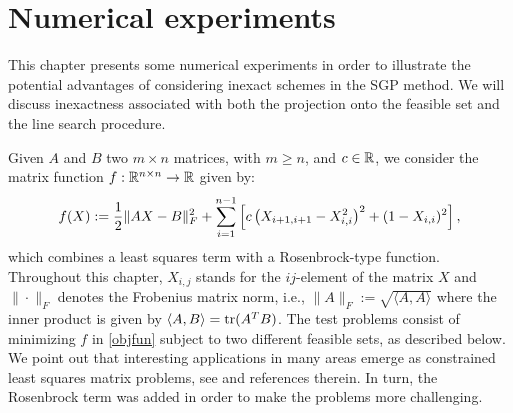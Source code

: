 \chapter{Numerical experiments} \label{chap:NumExp}
\thispagestyle{empty}

This chapter presents some numerical experiments in order to illustrate the potential advantages of considering inexact schemes in the SGP method.
We will discuss inexactness associated with both the projection onto the feasible set and the line search procedure.

Given $A$ and $B$ two $m\times n$ matrices, with $m\geq n$, and $c\in\mathbb{R}$, we consider the matrix function $f:\mathbb{R}^{n\times n}\to\mathbb{R}$ given by:
\begin{equation}\label{objfun}
	f(X):=\displaystyle\frac{1}{2}\|AX-B\|^2_F + \sum_{i=1}^{n-1} \left[ c \left( X_{i+1,i+1}-X_{i,i}^2 \right)^2 + (1-X_{i,i})^2   \right],
\end{equation}
which combines a least squares term with a Rosenbrock-type function.
Throughout this chapter, $X_{i,j}$ stands for the $ij$-element of the matrix $X$ and $\|\cdot\|_F$ denotes the Frobenius matrix norm, i.e., $\|A\|_F:=\sqrt{\langle A,A \rangle}$ where the inner product is given by $\langle A,B \rangle = \textrm{tr}(A^TB)$.
The test problems consist of minimizing $f$ in \eqref{objfun} subject to two different feasible sets, as described below.
We point out that interesting applications in many areas emerge as constrained least squares matrix problems, see \cite{BirginMartinezRaydan2003} and references therein.
In turn, the Rosenbrock term was added in order to make the problems more challenging.

